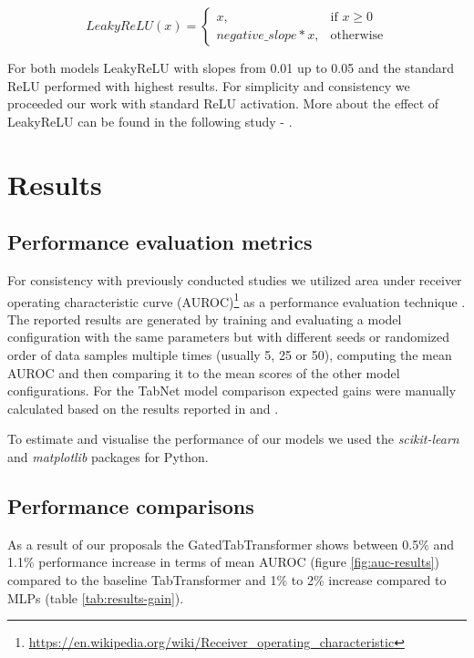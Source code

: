 \documentclass{article}
\begin{document}
\begin{equation}
    LeakyReLU(x)= 
    \begin{cases}
        x,& \text{if } x\geq 0\\
        negative\_slope * x,              & \text{otherwise}
    \end{cases}
\end{equation}

For both models LeakyReLU with slopes from 0.01 up to 0.05 and the standard ReLU performed with highest results. For simplicity and consistency we proceeded our work with standard ReLU activation. More about the effect of LeakyReLU can be found in the following study - \cite{fiedler2021simple}.

\section{Results}
\label{sec:results}

\subsection{Performance evaluation metrics}

For consistency with previously conducted studies we utilized area under receiver operating characteristic curve (AUROC)\footnote{\url{https://en.wikipedia.org/wiki/Receiver_operating_characteristic}} as a performance evaluation technique \cite{bradley1997use}. The reported results are generated by training and evaluating a model configuration with the same parameters but with different seeds or randomized order of data samples multiple times (usually 5, 25 or 50), computing the mean AUROC and then comparing it to the mean scores of the other model configurations. For the TabNet model comparison expected gains were manually calculated based on the results reported in \cite{Huang2020TabTransformerTD} and \cite{fiedler2021simple}.

To estimate and visualise the performance of our models we used the \textit{scikit-learn} \cite{scikit-learn} and \textit{matplotlib} \cite{Hunter:2007} packages for Python.

\subsection{Performance comparisons}

As a result of our proposals the GatedTabTransformer shows between 0.5\% and 1.1\% performance increase in terms of mean AUROC (figure \ref{fig:auc-results}) compared to the baseline TabTransformer and 1\% to 2\% increase compared to MLPs (table \ref{tab:results-gain}).
\end{document}
